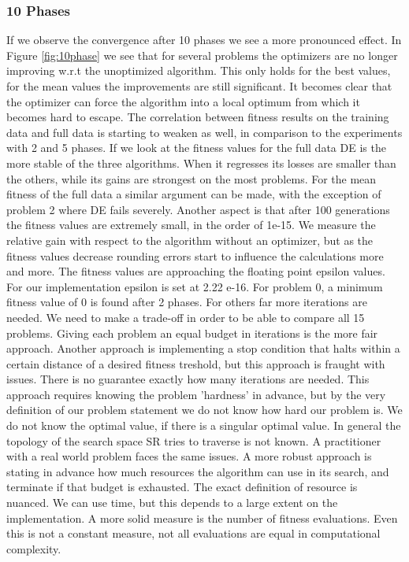 \subsubsection{10 Phases}
If we observe the convergence after 10 phases we see a more pronounced effect. In Figure \ref{fig:10phase} we see that for several problems the optimizers are no longer improving w.r.t the unoptimized algorithm. This only holds for the best values, for the mean values the improvements are still significant. It becomes clear that the optimizer can force the algorithm into a local optimum from which it becomes hard to escape. The correlation between fitness results on the training data and full data is starting to weaken as well, in comparison to the experiments with 2 and 5 phases. 
If we look at the fitness values for the full data DE is the more stable of the three algorithms. When it regresses its losses are smaller than the others, while its gains are strongest on the most problems. For the mean fitness of the full data a similar argument can be made, with the exception of problem 2 where DE fails severely.
Another aspect is that after 100 generations the fitness values are extremely small, in the order of 1e-15. We measure the relative gain with respect to the algorithm without an optimizer, but as the fitness values decrease rounding errors start to influence the calculations more and more. The fitness values are approaching the floating point epsilon values. For our implementation epsilon is set at 2.22 e-16. For problem 0, a minimum fitness value of 0 is found after 2 phases. For others far more iterations are needed. We need to make a trade-off in order to be able to compare all 15 problems. Giving each problem an equal budget in iterations is the more fair approach. Another approach is implementing a stop condition that halts within a certain distance of a desired fitness treshold, but this approach is fraught with issues. There is no guarantee exactly how many iterations are needed. This approach requires knowing the problem 'hardness' in advance, but by the very definition of our problem statement we do not know how hard our problem is. We do not know the optimal value, if there is a singular optimal value. In general the topology of the search space SR tries to traverse is not known. A practitioner with a real world problem faces the same issues. A more robust approach is stating in advance how much resources the algorithm can use in its search, and terminate if that budget is exhausted. The exact definition of resource is nuanced. We can use time, but this depends to a large extent on the implementation. A more solid measure is the number of fitness evaluations. Even this is not a constant measure, not all evaluations are equal in computational complexity.
